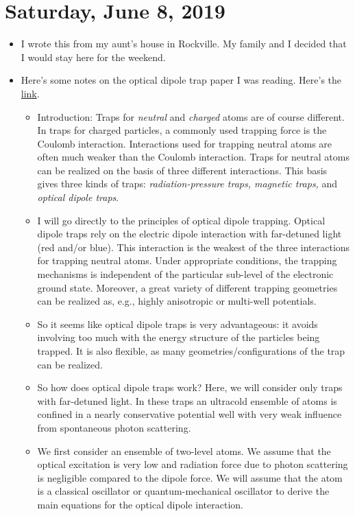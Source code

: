 \documentclass{report}
\theoremstyle{definition}
\begin{document}
\section{Saturday, June 8, 2019}
\begin{itemize}
	\item I wrote this from my aunt's house in Rockville. My family and I decided that I would stay here for the weekend.
	
	\item Here's some notes on the optical dipole trap paper I was reading. Here's the \href{https://arxiv.org/pdf/physics/9902072.pdf}{link}.
	
	\begin{itemize}
		\item Introduction: Traps for \textit{neutral} and \textit{charged} atoms are of course different. In traps for charged particles, a commonly used trapping force is the Coulomb interaction. Interactions used for trapping neutral atoms are often much weaker than the Coulomb interaction. Traps for neutral atoms can be realized on the basis of three different interactions. This basis gives three kinds of traps: \textit{radiation-pressure traps, magnetic traps,} and \textit{optical dipole traps}.
		
		\item I will go directly to the principles of optical dipole trapping. Optical dipole traps rely on the electric dipole interaction with far-detuned light (red and/or blue). This interaction is the weakest of the three interactions for trapping neutral atoms. Under appropriate conditions, the trapping mechanisms is independent of the particular sub-level of the electronic ground state. Moreover, a great variety of different trapping geometries can be realized as, e.g., highly anisotropic or multi-well potentials.

		
		\item So it seems like optical dipole traps is very advantageous: it avoids involving too much with the energy structure of the particles being trapped. It is also flexible, as many geometries/configurations of the trap can be realized.
		
		\item So how does optical dipole traps work? Here, we will consider only traps with far-detuned light.  In these traps an ultracold ensemble
		of atoms is confined in a nearly conservative potential well with very weak influence from spontaneous photon scattering. 
		
		
		\item We first consider an ensemble of two-level atoms. We assume that the optical excitation is very low and radiation force due to photon scattering is negligible compared to the dipole force. We will assume that the atom is a classical oscillator or quantum-mechanical oscillator to derive the main equations for the optical dipole interaction. 
		

\end{itemize}
\end{itemize}
\end{document}
